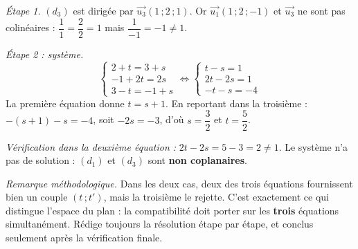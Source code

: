 \documentclass[11pt]{article}
\begin{document}
\begin{exoresolu}
\emph{Étape 1.} $(d_3)$ est dirigée par $\vec{u_3}(1\,;2\,;1)$. Or $\vec{u_1}(1\,;2\,;-1)$ et $\vec{u_3}$ ne sont pas colinéaires : $\dfrac{1}{1} = \dfrac{2}{2} = 1$ mais $\dfrac{1}{-1} = -1 \neq 1$.

\emph{Étape 2 : système.}
\[ \begin{cases} 2 + t = 3 + s \\ -1 + 2t = 2s \\ 3 - t = -1 + s \end{cases} \iff \begin{cases} t - s = 1 \\ 2t - 2s = 1 \\ -t - s = -4 \end{cases} \]
La première équation donne $t = s + 1$. En reportant dans la troisième : $-(s+1) - s = -4$, soit $-2s = -3$, d'où $s = \dfrac{3}{2}$ et $t = \dfrac{5}{2}$.

\emph{Vérification dans la deuxième équation :} $2t - 2s = 5 - 3 = 2 \neq 1$. Le système n'a pas de solution : $(d_1)$ et $(d_3)$ sont \textbf{non coplanaires}.

\emph{Remarque méthodologique.} Dans les deux cas, deux des trois équations fournissent bien un couple $(t\,;t')$, mais la troisième le rejette. C'est exactement ce qui distingue l'espace du plan : la compatibilité doit porter sur les \textbf{trois} équations simultanément. Rédige toujours la résolution étape par étape, et conclus seulement après la vérification finale.
\end{exoresolu}
\end{document}
